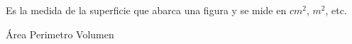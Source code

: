
\question  Es la medida de la superficie que abarca una figura y se mide en
           $cm^2$, $m^2$, etc.

  \begin{oneparchoices}
    \CorrectChoice Área
    \choice Perimetro
    \choice Volumen
  \end{oneparchoices}
